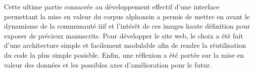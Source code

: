 	Cette ultime partie consacrée au développement effectif d'une interface permettant la mise en valeur du corpus alphonsin a permis de mettre en avant le dynamisme de la communauté \acrshort{iiif} et l'intérêt de ces images haute définition pour exposer de précieux manuscrits. Pour développer le site web, le choix a été fait d'une architecture simple et facilement modulable afin de rendre la réutilisation du code la plus simple posisble. Enfin, une réflexion a été portée sur la mise en valeur des données et les possibles axes d'amélioration pour le futur. 

